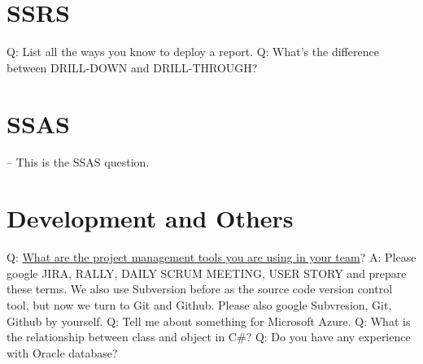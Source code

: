 \documentclass[a4paper,11pt]{article}
\begin{document}
\section{SSRS}
Q: List all the ways you know to deploy a report.\newline \newline
\noindent 
Q: What's the difference between DRILL-DOWN and DRILL-THROUGH? \newline \newline


\section{SSAS}
-- This is the SSAS question.

\section{Development and Others}
Q: \ul{What are the project management tools you are using in your team}?\newline
A: Please google JIRA, RALLY, DAILY SCRUM MEETING, USER STORY and prepare these terms. We also use Subversion before as the source code version control tool, but now we turn to Git and Github. Please also google Subvresion, Git, Github by yourself.\newline \newline
\noindent 
Q: Tell me about something for Microsoft Azure. \newline \newline
\noindent 
Q: What is the relationship between class and object in C\#? \newline \newline
\noindent 
Q: Do you have any experience with Oracle database? \newline \newline
\end{document}
